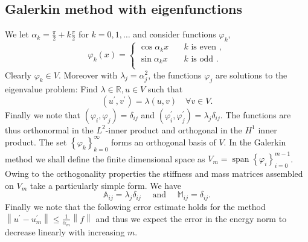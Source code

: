 \documentclass[a4paper,10pt]{article}
\newcommand{\R}{\ensuremath{\mathbb{R}}}
\newcommand{\norm}[1]{\ensuremath{\left\|#1\right\|}}
\newcommand{\inner}[2]{\ensuremath{\left(#1, #2\right)}}
\newcommand{\Amat}{\ensuremath{\mathbb{A}}}
\newcommand{\Mmat}{\ensuremath{\mathbb{M}}}
\DeclareMathOperator{\spn}{span}
\begin{document}
  \subsection{Galerkin method with eigenfunctions}
  We let $\alpha_k=\frac{\pi}{2}+k\frac{\pi}{2}$ for $k=0, 1, \dots$ and
  consider functions $\varphi_k$,
  \[
    \varphi_k(x) = \begin{cases}
                \cos{\alpha_k x} &\quad k \text{ is even },\\
                \sin{\alpha_k x} &\quad k \text{ is odd }.\\
              \end{cases}
  \]
  Clearly $\varphi_k\in V$. Moreover with $\lambda_j=\alpha_j^2$, the functions
  $\varphi_j$ are solutions to the eigenvalue problem: Find $\lambda\in\R, u\in V$
  such that
  \[
    \inner{u^{\prime}}{v^{\prime}} = \lambda \inner{u}{v}\quad\forall v \in V.
  \]
  Finally we note that $\inner{\varphi_i}{\varphi_j}=\delta_{ij}$ and 
  $\inner{\varphi_i^{\prime}}{\varphi_j^{\prime}}=\lambda_j\delta_{ij}$. The
  functions are thus orthonormal in the $L^2$-inner product and orthogonal in
  the $H^1$ inner product. The set $\left\{\varphi_k\right\}_{k=0}^{\infty}$
  forms an orthogonal basis of $V$. In the Galerkin method we shall define the
  finite dimensional space as $V_m=\spn\left\{\varphi_i\right\}_{i=0}^{m-1}$.
  Owing to the orthogonality properties the stiffness and mass matrices
  assembled on $V_m$ take a particularly simple form. We have
  \begin{equation}
    \label{eq:shen_mat}
    \Amat_{ij} = \lambda_j\delta_{ij}
    \quad\text{ and }\quad
    \Mmat_{ij} = \delta_{ij}.
  \end{equation}
  Finally we note that the following error estimate holds for the method 
  $\norm{u^{\prime}-u_m^{\prime}}\leq \frac{1}{\alpha_m}\norm{f}$ and thus
  we expect the error in the energy norm to decrease linearly with increasing
  $m$.
\end{document}
